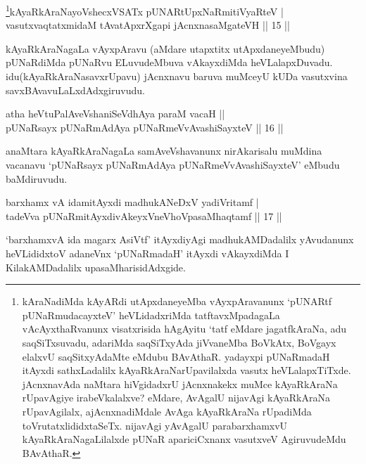 

\begin{shl}
\footnote{kAraNadiMda kAyARdi utApxdaneyeMba vAyxpAravanunx `pUNARtf pUNaRmudacayxteV' heVLidadxriMda tatftavxMpadagaLa vAcAyxthaRvanunx visatxrisida hAgAyitu `tatf eMdare jagatfkAraNa, adu saqSiTxsuvadu, adariMda saqSiTxyAda jiVvaneMba BoVkAtx, BoVgayx elalxvU saqSitxyAdaMte eMdubu BAvAthaR. yadayxpi pUNaRmadaH itAyxdi sathxLadalilx kAyaRkAraNarUpavilalxda vasutx heVLalapxTiTxde. jAcnxnavAda naMtara hiVgidadxrU jAcnxnakekx muMce kAyaRkAraNa rUpavAgiye irabeVkalalxve? eMdare, AvAgalU nijavAgi kAyaRkAraNa rUpavAgilalx, ajAcnxnadiMdale AvAga kAyaRkAraNa rUpadiMda toVrutatxlididxtaSeTx. nijavAgi yAvAgalU parabarxhamxvU kAyaRkAraNagaLilalxde pUNaR apariciCxnanx vasutxveV AgiruvudeMdu BAvAthaR.}kAyaRkAraNayoVshecxVSATx pUNARtUpxNaRmitiVyaRteV  | \\
vasutxvaqtatxmidaM tAvatApxrXgapi jAcnxnasaMgateVH \hfill ||  15 ||  
\end{shl}

\begin{artha}
kAyaRkAraNagaLa vAyxpAravu (aMdare utapxtitx utApxdaneyeMbudu) pUNaRdiMda pUNaRvu ELuvudeMbuva vAkayxdiMda heVLalapxDuvadu. idu\break (kAyaRkAraNasavxrUpavu) jAcnxnavu baruva muMceyU kUDa vasutxvina savxBAvavuLaLxdAdxgiruvudu.
\end{artha}


\begin{shl}
atha heVtuPalAveVshaniSeVdhAya paraM vacaH ||  \\
pUNaRsayx pUNaRmAdAya pUNaRmeVvAvashiSayxteV \hfill||  16 ||  
\end{shl}

\begin{artha}
anaMtara kAyaRkAraNagaLa samAveVshavanunx nirAkarisalu muMdina vacanavu `pUNaRsayx pUNaRmAdAya pUNaRmeVvAvashiSayxteV' eMbudu baMdiruvudu.
\end{artha}

\begin{shl}
barxhamx vA idamitAyxdi madhukANeDxV yadiVritamf  | \\
tadeVva pUNaRmitAyxdivAkeyxVneVhoVpasaMhaqtamf \hfill ||  17 ||  
\end{shl}

\begin{artha}
`barxhamxvA ida magarx AsiVtf' itAyxdiyAgi madhukAMDadalilx yAvudanunx heVLididxtoV adaneVnx `pUNaRmadaH' itAyxdi vAkayxdiMda I KilakAMDadalilx upasaMharisidAdxgide.
\end{artha}

